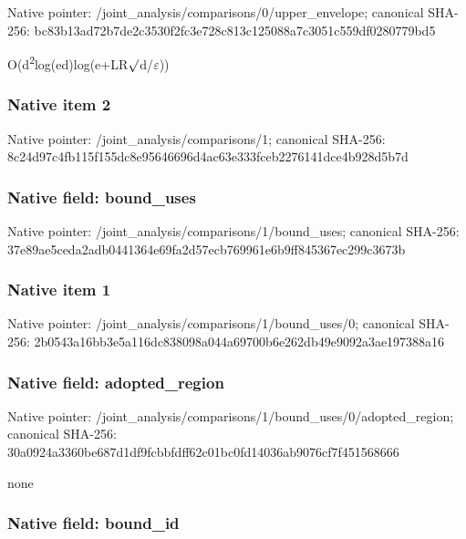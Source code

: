 \documentclass[10pt,a4paper]{article}
\begin{document}
Native pointer: /joint\_analysis/comparis\allowbreak{}ons/0/upper\_envelope; canonical SHA-256: bc83b13ad72b7de2c3530f2f\allowbreak{}c3e728c813c125088a7c3051\allowbreak{}c559df0280779bd5


O(d\textsuperscript{2}log(ed)log(e+LR\ensuremath{\sqrt{\vphantom{x}}}d/\ensuremath{\varepsilon}))


\subsubsection{Native item 2}


Native pointer: /joint\_analysis/comparisons/1; canonical SHA-256: 8c24d97c4fb115f155dc8e95\allowbreak{}646696d4ac63e333fceb2276\allowbreak{}141dce4b928d5b7d



\subsubsection{Native field: bound\_uses}


Native pointer: /joint\_analysis/comparis\allowbreak{}ons/1/bound\_uses; canonical SHA-256: 37e89ae5ceda2adb0441364e\allowbreak{}69fa2d57ecb769961e6b9ff8\allowbreak{}45367ec299c3673b



\subsubsection{Native item 1}


Native pointer: /joint\_analysis/comparis\allowbreak{}ons/1/bound\_uses/0; canonical SHA-256: 2b0543a16bb3e5a116dc8380\allowbreak{}98a044a69700b6e262db49e9\allowbreak{}092a3ae197388a16



\subsubsection{Native field: adopted\_region}


Native pointer: /joint\_analysis/comparis\allowbreak{}ons/1/bound\_uses/0/adopt\allowbreak{}ed\_region; canonical SHA-256: 30a0924a3360be687d1df9fc\allowbreak{}bbfdff62c01bc0fd14036ab9\allowbreak{}076cf7f451568666


none


\subsubsection{Native field: bound\_id}
\end{document}
